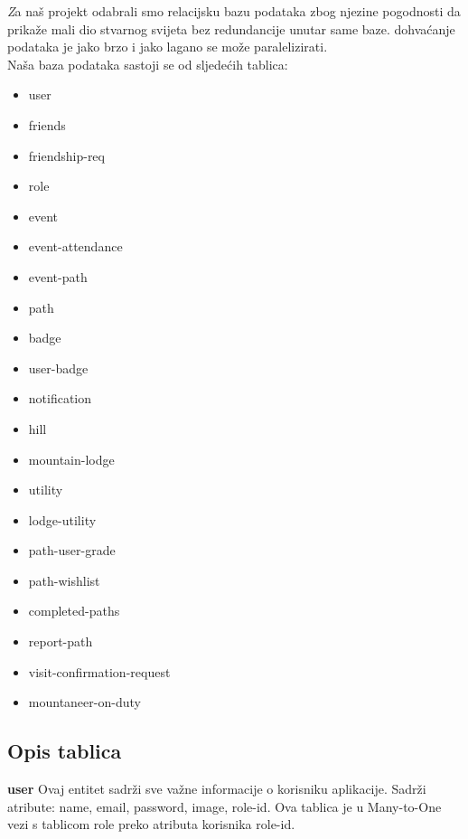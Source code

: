 		\textit Za naš projekt odabrali smo relacijsku bazu podataka zbog njezine pogodnosti da prikaže mali dio stvarnog svijeta bez redundancije unutar same baze. dohvaćanje podataka je jako brzo i jako lagano se može paralelizirati. \\
Naša baza podataka sastoji se od sljedećih tablica:
\begin{itemize}

\item
	user
\item
	friends
\item
	friendship-req
\item
	role
\item
	event
\item
	event-attendance
\item
	event-path
\item
	path
\item
	badge
\item
	user-badge
\item
	notification
\item
	hill
\item
	mountain-lodge
\item
	utility
\item
	lodge-utility
\item
	path-user-grade
\item
	path-wishlist
\item
	completed-paths
\item
	report-path
\item
	visit-confirmation-request
\item
	mountaneer-on-duty
	


\end{itemize}
		
			\subsection{Opis tablica}
			
			\textbf{user}  Ovaj entitet sadrži sve važne informacije o korisniku aplikacije. Sadrži atribute: name, email, password, image, role-id.  Ova tablica je u Many-to-One vezi s tablicom role preko atributa korisnika role-id.
			
